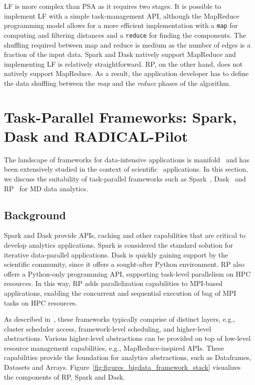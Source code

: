 LF is more complex than PSA as it requires two stages. It is possible to
implement LF with a simple task-management API, although the MapReduce
programming model allows for a more efficient implementation with a \texttt{map}
for computing and filtering distances and a \texttt{reduce} for finding the
components. The shuffling required between map and reduce is medium as the
number of edges is a fraction of the input data. Spark and Dask natively support
MapReduce and implementing LF is relatively straightforward. RP, on
the other hand, does not natively support MapReduce. As a result, the
application developer has to define the data shuffling between the \emph{map}
and the \emph{reduce} phases of the algorithm.

\section{Task-Parallel Frameworks: Spark, Dask and RADICAL-Pilot}
\label{sec:frameworks}

The landscape of frameworks for data-intensive applications is
manifold~\cite{jha2014tale,kamburugamuve2017anatomy} and has been extensively
studied in the context of scientific~\cite{jha2017introducing} applications. In
this section, we discuss the suitability of task-parallel frameworks such as
Spark~\cite{zaharia2010spark}, Dask~\cite{rocklin2015dask} and
RP~\cite{merzky2019using} for MD data analytics.

\subsection{Background}

Spark and Dask provide APIs, caching and other capabilities that are critical to
develop analytics applications. Spark is considered the standard solution for
iterative data-parallel applications. Dask is quickly gaining support by
the scientific community, since it offers a sought-after Python environment.
RP also offers a Python-only programming API, supporting task-level
parallelism on HPC resources. In this way, RP adds parallelization
capabilities to MPI-based applications, enabling the concurrent and sequential
execution of bag of MPI tasks on HPC resources.

As described in~\cite{jha2014tale}, these frameworks typically comprise of
distinct layers, e.g., cluster scheduler access, framework-level scheduling, and
higher-level abstractions. Various higher-level abstractions can be provided on
top of low-level resource management capabilities, e.g., MapReduce-inspired
APIs. These capabilities provide the foundation for analytics abstractions, such
as Dataframes, Datasets and Arrays.
Figure~\ref{fig:figures_bigdata_framework_stack} visualizes the components of
RP, Spark and Dask.

